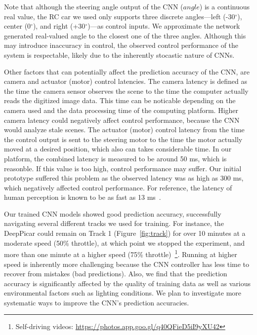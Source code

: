 Note that although the steering angle output of the CNN ($angle$) is
a continuous real value, the RC car we used only supports
three discrete angles---left (-30$^{\circ}$), center 
(0$^{\circ}$), and right (+30$^{\circ}$)---as control inputs.
We approximate the network generated real-valued angle to the closest
one of the three angles. Although this may introduce inaccuracy in
control, the observed control performance of the system is respectable,
likely due to the inherently stocastic nature of CNNs.


Other factors that can potentially affect the prediction accuracy of
the CNN, are camera and actuator (motor) control latencies. The camera
latency is defined as the time the camera sensor observes the scene to the
time the computer actually reads the digitized image data. This time
can be noticable depending on the camera used and the data processing
time of the computing platform. Higher camera latency could
negatively affect control performance, because the CNN would analyze
stale scenes. The actuator (motor) control latency from the time
the control output is sent to the steering motor to the time the motor
actually moved at a desired position, which also can takes
considerable time. In our platform, the combined latency is measured
to be around 50 ms, which is reasonble.
If this value is too high, control performance may suffer.
Our initial prototype suffered this problem as the observed latency
was as high as 300 ms, which negatively affected control performance.
For reference, the latency of human perception is known to be as fast
as 13 ms~\cite{ThomasBurger2015}. 

Our trained CNN models showed good prediction accuracy, successfully
navigating several different tracks we used for training.
For instance, the DeepPicar could remain on Track 1
(Figure~\ref{fig:track}) for over 10 minutes at a moderate speed (50\%
throttle), at which point we stopped the experiment, and more than one
minute at a higher speed (75\% throttle)~\footnote{Self-driving videos: \url{https://photos.app.goo.gl/q40QFieD5iI9yXU42}
}. Running at
higher speed is inherently more challenging because the CNN controller
has less time to recover from mistakes (bad predictions).  Also, we
find that the prediction accuracy is significantly affected by the
quality of training data as well as various environmental factors such
as lighting conditions. We plan to investigate more systematic ways
to improve the CNN's prediction accuracies.

